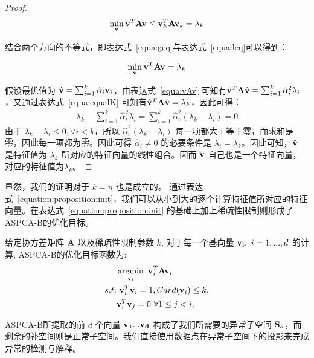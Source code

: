 \begin{proof}
\begin{equation}
\label{equa:leq}
\min_{\bf v}{{\bf v}^T{\bf A}{\bf v}} \leq {\bf v}_k^T{\bf A}{\bf v}_k = \lambda_k
\end{equation}

结合两个方向的不等式，即表达式~\ref{equa:geq}与表达式~\ref{equa:leq}可以得到：

\begin{equation}
\label{equa:equalK}
\min_{\bf v}{{\bf v}^T{\bf A}{\bf v}} = \lambda_k
\end{equation}

假设最优值为 $\hat{{\bf v}} = \sum_{i=1}^{k} \hat{\alpha}_i {\bf v}_i$，由表达式~\ref{equa:vAv} 可知有$\hat{{\bf v}}^T{\bf A}\hat{{\bf v}} = \sum_{i=1}^{k} \hat{\alpha}_i^2 \lambda_i$ ，又通过表达式~\ref{equa:equalK} 可知有$\hat{{\bf v}}^T{\bf A}\hat{{\bf v}} = \lambda_k$，因此可得：
\begin{equation*}
\begin{split}
\lambda_k - \sum_{i=1}^{k} \hat{\alpha}_i^2 \lambda_i = \sum_{i=1}^{k} \hat{\alpha}_i^2 (\lambda_k - \lambda_i) = 0 
\end{split}
\end{equation*}
由于 $\lambda_k - \lambda_i\leq 0,\forall i<k$，所以 $\hat{\alpha}_i^2 (\lambda_k - \lambda_i) $ 每一项都大于等于零，而求和是零，因此每一项都为零。因此可得 $\hat{\alpha}_i \neq 0$ 的必要条件是 $\lambda_i = \lambda_k$。因此可知，$\hat{{\bf v}}$ 是特征值为 $\lambda_k$  所对应的特征向量的线性组合。因而 $\hat{{\bf v}}$ 自己也是一个特征向量，对应的特征值为$\lambda_k$。
\end{proof}

显然，我们的证明对于 $k=n$ 也是成立的。 通过表达式~\ref{equation:proposition:init}，我们可以从小到大的逐个计算特征值所对应的特征向量。在表达式~\ref{equation:proposition:init} 的基础上加上稀疏性限制则形成了ASPCA-B的优化目标。

给定协方差矩阵 ${\bf A}$ 以及稀疏性限制参数 $k$, 对于每一个基向量 ${\bf v_i},\ i = 1,...,d$ 的计算, ASPCA-B的优化目标函数为:
\begin{equation}
\label{equation:typical_MSPCA-B}
\begin{split}
 &\operatorname*{arg min}_{{\bf v}_i}\ {\bf v}_i^T{\bf A}{\bf v}_i\\
s.t. &\ {\bf v}_i^T{\bf v}_i=1,  Card({\bf v}_i)\leq k. \\
& {\bf v}_i^T{\bf v}_j=0\ \forall 1\leq j<i,
 \end{split}
\end{equation}

ASPCA-B所提取的前 $d$ 个向量 $\bf{v}_1...\bf{v}_d$ 构成了我们所需要的异常子空间 ${\bf S}_a$，而剩余的补空间则是正常子空间。我们直接使用数据点在异常子空间下的投影来完成异常的检测与解释。
